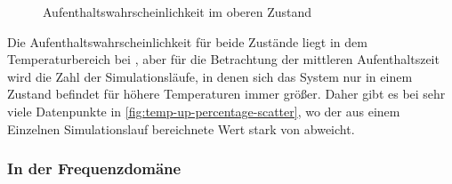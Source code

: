\documentclass[main.tex]{subfiles}
\begin{document}
\begin{figure}[H]
    \centering
    \caption{Aufenthaltswahrscheinlichkeit im oberen Zustand}\label{fig:temp-up-percentage}
\end{figure}

Die Aufenthaltswahrscheinlichkeit für beide Zustände liegt in dem Temperaturbereich bei , aber für die Betrachtung der mittleren Aufenthaltszeit wird die Zahl der Simulationsläufe, in denen sich das System nur in einem Zustand befindet für höhere Temperaturen immer größer. Daher gibt es bei  sehr viele Datenpunkte in \cref{fig:temp-up-percentage-scatter}, wo der aus einem Einzelnen Simulationslauf bereichnete Wert stark von  abweicht.

\subsubsection{In der Frequenzdomäne}
\end{document}
